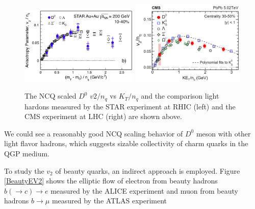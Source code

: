 \begin{figure}[hbtp]
\begin{center}
\includegraphics[width=0.50\textwidth]{Figures/Chapter2/STARv2.png}
\includegraphics[width=0.485\textwidth]{Figures/Chapter2/CMSv2.png}
\caption{The NCQ scaled $D^0$ $v2/n_q$ vs $K_T/n_q$ and the comparison light hardons measured by the STAR experiment at RHIC (left) and the CMS experiment at LHC (right) are shown above.}
\label{HQV2}
\end{center}
\end{figure}   

We could see a reasonably good NCQ scaling behavior of $D^0$ meson with other light flavor hadrons, which suggests sizable collectivity of charm quarks in the QGP medium. 

To study the $v_2$ of beauty quarks, an indirect approach is employed. Figure \ref{BeautyEV2} shows the elliptic flow of electron from beauty hadrons $b (\rightarrow c) \rightarrow e$ measured by the ALICE experiment \cite{ALICENPElec} and muon from beauty hadrons $b \rightarrow \mu$ measured by the ATLAS experiment \cite{ATLASNPMuon}


